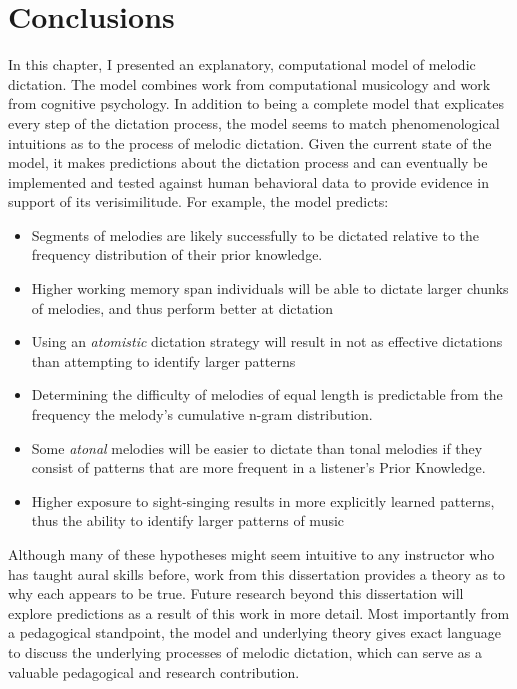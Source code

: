 \documentclass[12pt,]{book}
\providecommand{\tightlist}{%
  \setlength{\itemsep}{0pt}\setlength{\parskip}{0pt}}
\begin{document}
\hypertarget{conclusions-4}{%
\section{Conclusions}\label{conclusions-4}}

In this chapter, I presented an explanatory, computational model of melodic dictation.
The model combines work from computational musicology and work from cognitive psychology.
In addition to being a complete model that explicates every step of the dictation process, the model seems to match phenomenological intuitions as to the process of melodic dictation.
Given the current state of the model, it makes predictions about the dictation process and can eventually be implemented and tested against human behavioral data to provide evidence in support of its verisimilitude.
For example, the model predicts:

\begin{itemize}
\tightlist
\item
  Segments of melodies are likely successfully to be dictated relative to the frequency distribution of their prior knowledge.
\item
  Higher working memory span individuals will be able to dictate larger chunks of melodies, and thus perform better at dictation
\item
  Using an \emph{atomistic} dictation strategy will result in not as effective dictations than attempting to identify larger patterns
\item
  Determining the difficulty of melodies of equal length is predictable from the frequency the melody's cumulative n-gram distribution.
\item
  Some \emph{atonal} melodies will be easier to dictate than tonal melodies if they consist of patterns that are more frequent in a listener's Prior Knowledge.
\item
  Higher exposure to sight-singing results in more explicitly learned patterns, thus the ability to identify larger patterns of music
\end{itemize}

Although many of these hypotheses might seem intuitive to any instructor who has taught aural skills before, work from this dissertation provides a theory as to why each appears to be true.
Future research beyond this dissertation will explore predictions as a result of this work in more detail.
Most importantly from a pedagogical standpoint, the model and underlying theory gives exact language to discuss the underlying processes of melodic dictation, which can serve as a valuable pedagogical and research contribution.
\end{document}
